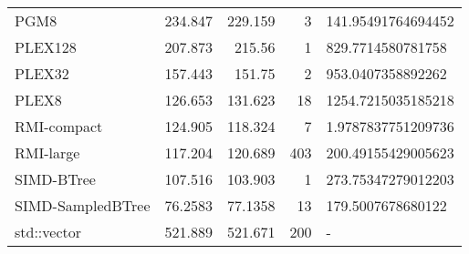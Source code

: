 \begin{tabular}{lrrrl}
 PGM8              &               234.847  &              229.159  &            3 & 141.95491764694452 \\
 PLEX128           &               207.873  &              215.56   &            1 & 829.7714580781758  \\
 PLEX32            &               157.443  &              151.75   &            2 & 953.0407358892262  \\
 PLEX8             &               126.653  &              131.623  &           18 & 1254.7215035185218 \\
 RMI-compact       &               124.905  &              118.324  &            7 & 1.9787837751209736 \\
 RMI-large         &               117.204  &              120.689  &          403 & 200.49155429005623 \\
 SIMD-BTree        &               107.516  &              103.903  &            1 & 273.75347279012203 \\
 SIMD-SampledBTree &                76.2583 &               77.1358 &           13 & 179.5007678680122  \\
 std::vector       &               521.889  &              521.671  &          200 & -                  \\
\hline
\end{tabular}